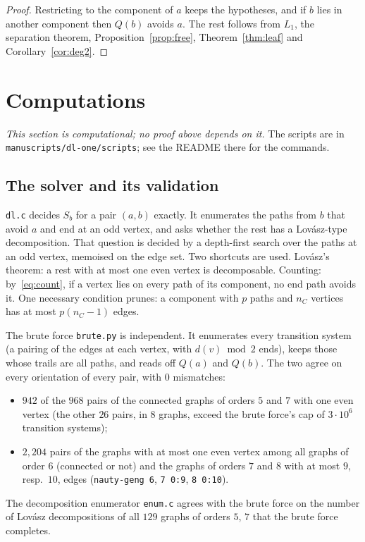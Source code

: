 \documentclass[11pt]{amsart}
\theoremstyle{definition}
\begin{document}
\begin{proof}
Restricting to the component of $a$ keeps the hypotheses, and if $b$ lies in another component then
$Q(b)$ avoids $a$. The rest follows from $L_1$, the separation theorem, Proposition~\ref{prop:free},
Theorem~\ref{thm:leaf} and Corollary~\ref{cor:deg2}.
\end{proof}

\section{Computations}\label{sec:comp}

\emph{This section is computational; no proof above depends on it.} The scripts are in
\texttt{manuscripts/dl-one/scripts}; see the README there for the commands.

\subsection*{The solver and its validation}
\texttt{dl.c} decides $S_b$ for a pair $(a,b)$ exactly. It enumerates the paths from $b$ that avoid
$a$ and end at an odd vertex, and asks whether the rest has a Lov\'asz-type decomposition. That
question is decided by a depth-first search over the paths at an odd vertex, memoised on the edge
set. Two shortcuts are used. Lov\'asz's theorem: a rest with at most one even vertex is
decomposable. Counting: by~\eqref{eq:count}, if a vertex lies on every path of its component, no
end path avoids it. One necessary condition prunes: a component with $p$ paths and $n_C$ vertices
has at most $p(n_C-1)$ edges.

The brute force \texttt{brute.py} is independent. It enumerates every transition system (a pairing of
the edges at each vertex, with $d(v)\bmod2$ ends), keeps those whose trails are all paths, and reads
off $Q(a)$ and $Q(b)$. The two agree on every orientation of every pair, with $0$ mismatches:
\begin{itemize}
\item $942$ of the $968$ pairs of the connected graphs of orders $5$ and $7$ with one even vertex (the
other $26$ pairs, in $8$ graphs, exceed the brute force's cap of $3\cdot10^6$ transition systems);
\item $2{,}204$ pairs of the graphs with at most one even vertex among all graphs of order $6$
(connected or not) and the graphs of orders $7$ and $8$ with at most $9$, resp.\ $10$, edges
(\texttt{nauty-geng 6}, \texttt{7 0:9}, \texttt{8 0:10}).
\end{itemize}
The decomposition enumerator \texttt{enum.c} agrees with the brute force on the number of Lov\'asz
decompositions of all $129$ graphs of orders $5$, $7$ that the brute force completes.
\end{document}
